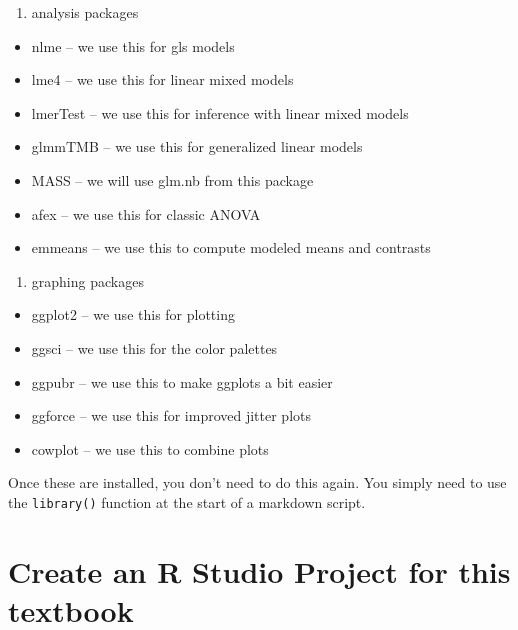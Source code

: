 \documentclass[]{book}
\providecommand{\tightlist}{%
  \setlength{\itemsep}{0pt}\setlength{\parskip}{0pt}}
\begin{document}
\begin{enumerate}
\def\labelenumi{\arabic{enumi}.}
\setcounter{enumi}{1}
\tightlist
\item
  analysis packages
\end{enumerate}

\begin{itemize}
\tightlist
\item
  nlme -- we use this for gls models
\item
  lme4 -- we use this for linear mixed models
\item
  lmerTest -- we use this for inference with linear mixed models
\item
  glmmTMB -- we use this for generalized linear models
\item
  MASS -- we will use glm.nb from this package
\item
  afex -- we use this for classic ANOVA
\item
  emmeans -- we use this to compute modeled means and contrasts
\end{itemize}

\begin{enumerate}
\def\labelenumi{\arabic{enumi}.}
\setcounter{enumi}{2}
\tightlist
\item
  graphing packages
\end{enumerate}

\begin{itemize}
\tightlist
\item
  ggplot2 -- we use this for plotting
\item
  ggsci -- we use this for the color palettes
\item
  ggpubr -- we use this to make ggplots a bit easier
\item
  ggforce -- we use this for improved jitter plots
\item
  cowplot -- we use this to combine plots
\end{itemize}

Once these are installed, you don't need to do this again. You simply need to use the \texttt{library()} function at the start of a markdown script.

\hypertarget{create-an-r-studio-project-for-this-textbook}{%
\section{Create an R Studio Project for this textbook}\label{create-an-r-studio-project-for-this-textbook}}
\end{document}
